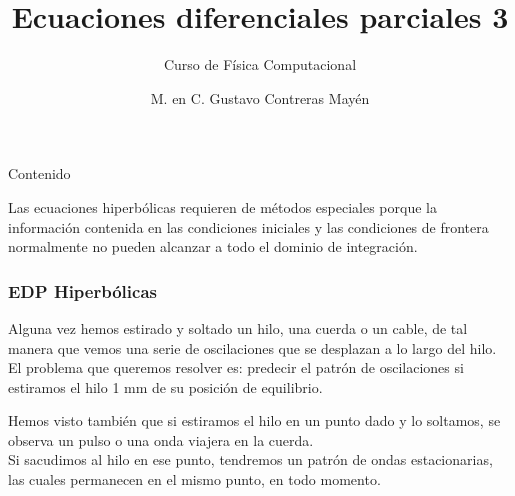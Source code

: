 

\beamertemplatenavigationsymbolsempty
\title{Ecuaciones diferenciales parciales 3}
\subtitle{Curso de Física Computacional}
\author[]{M. en C. Gustavo Contreras Mayén}

\maketitle
\fontsize{14}{14}\selectfont
{}
\begin{frame}{Contenido}
\tableofcontents[pausesections]
\end{frame}
\begin{frame}
Las ecuaciones hiperbólicas requieren de métodos especiales porque la información contenida en las condiciones iniciales y las condiciones de frontera normalmente no pueden alcanzar a todo el dominio de integración.
\end{frame}
\begin{frame}
\frametitle{EDP Hiperbólicas}
Alguna vez hemos estirado y soltado un hilo, una cuerda o un cable, de tal manera que vemos una serie de oscilaciones que se desplazan a lo largo del hilo.
\\
\bigskip
El problema que queremos resolver es: predecir el patrón de oscilaciones si estiramos el hilo 1 mm de su posición de equilibrio.
\end{frame}
\begin{frame}
Hemos visto también que si estiramos el hilo en un punto dado y lo soltamos, se observa un pulso o una onda viajera en la cuerda.
\\
\bigskip
Si sacudimos al hilo en ese punto, tendremos un patrón de ondas estacionarias, las cuales permanecen en el mismo punto, en todo momento.
\end{frame}
